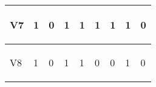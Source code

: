 \documentclass{article}
\begin{document}
\begin{center}
\begin{table}[!h]
\begin{tabular}{|p{}|p{}|p{}|p{}|p{}|p{}|p{}|p{}|p{}|}
 \\
\hline 
 \begin{center}
V7
\end{center}
 & \begin{center}
1
\end{center}
 & \begin{center}
0
\end{center}
 & \begin{center}
1
\end{center}
 & \begin{center}
1
\end{center}
 & \begin{center}
1
\end{center}
 & \begin{center}
1
\end{center}
 & \begin{center}
1
\end{center}
 & \begin{center}
0
\end{center}
 \\
\hline 
 \begin{center}
V8
\end{center}
 & \begin{center}
1
\end{center}
 & \begin{center}
0
\end{center}
 & \begin{center}
1
\end{center}
 & \begin{center}
1
\end{center}
 & \begin{center}
0
\end{center}
 & \begin{center}
0
\end{center}
 & \begin{center}
1
\end{center}
 & \begin{center}
0
\end{center}
 \\
 \hline
\end{tabular}
        
        \end{table}
\end{center}


\end{document}
